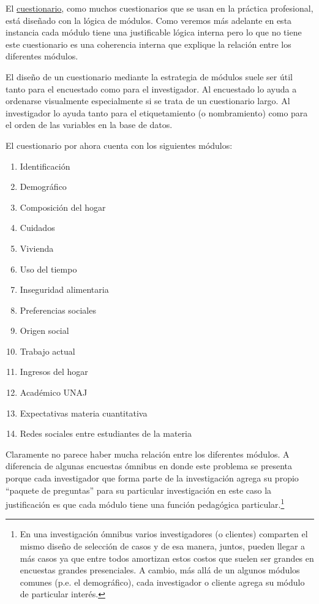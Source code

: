 \documentclass[
  letterpaper,
  DIV=11,
  numbers=noendperiod]{scrreprt}
\begin{document}
El
\href{https://drive.google.com/file/d/1nbU16-b2RxvPQZV2SS-Aodl1d7zPr9Cw/view?usp=sharing}{cuestionario},
como muchos cuestionarios que se usan en la práctica profesional, está
diseñado con la lógica de módulos. Como veremos más adelante en esta
instancia cada módulo tiene una justificable lógica interna pero lo que
no tiene este cuestionario es una coherencia interna que explique la
relación entre los diferentes módulos.

El diseño de un cuestionario mediante la estrategia de módulos suele ser
útil tanto para el encuestado como para el investigador. Al encuestado
lo ayuda a ordenarse visualmente especialmente si se trata de un
cuestionario largo. Al investigador lo ayuda tanto para el
etiquetamiento (o nombramiento) como para el orden de las variables en
la base de datos.

El cuestionario por ahora cuenta con los siguientes módulos:

\begin{enumerate}
\def\labelenumi{\arabic{enumi}.}
\item
  Identificación
\item
  Demográfico
\item
  Composición del hogar
\item
  Cuidados
\item
  Vivienda
\item
  Uso del tiempo
\item
  Inseguridad alimentaria
\item
  Preferencias sociales
\item
  Origen social
\item
  Trabajo actual
\item
  Ingresos del hogar
\item
  Académico UNAJ
\item
  Expectativas materia cuantitativa
\item
  Redes sociales entre estudiantes de la materia
\end{enumerate}

Claramente no parece haber mucha relación entre los diferentes módulos.
A diferencia de algunas encuestas ómnibus en donde este problema se
presenta porque cada investigador que forma parte de la investigación
agrega su propio ``paquete de preguntas'' para su particular
investigación en este caso la justificación es que cada módulo tiene una
función pedagógica particular.\footnote{En una investigación ómnibus
  varios investigadores (o clientes) comparten el mismo diseño de
  selección de casos y de esa manera, juntos, pueden llegar a más casos
  ya que entre todos amortizan estos costos que suelen ser grandes en
  encuestas grandes presenciales. A cambio, más allá de un algunos
  módulos comunes (p.e. el demográfico), cada investigador o cliente
  agrega su módulo de particular interés.}
\end{document}
